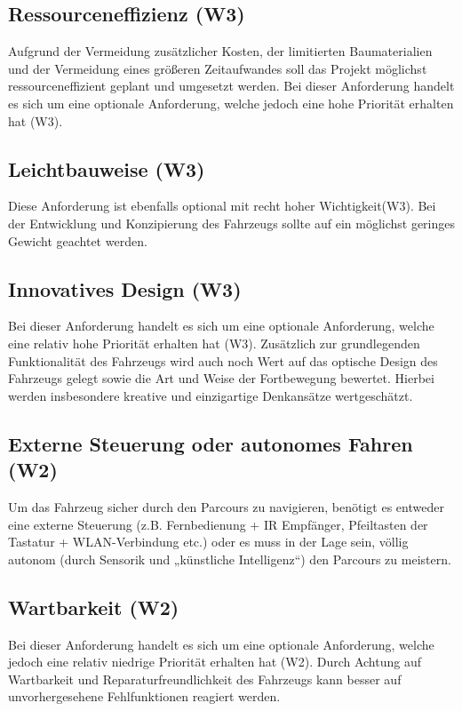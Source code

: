 \subsection*{Ressourceneffizienz (W3)}
Aufgrund der Vermeidung zusätzlicher Kosten, der limitierten Baumaterialien und der Vermeidung eines größeren Zeitaufwandes soll das Projekt möglichst ressourceneffizient geplant und umgesetzt werden. Bei dieser Anforderung handelt es sich um eine optionale Anforderung, welche jedoch eine hohe Priorität erhalten hat (W3).

\subsection*{Leichtbauweise (W3)}
Diese Anforderung ist ebenfalls optional mit recht hoher Wichtigkeit(W3). Bei der Entwicklung und Konzipierung des Fahrzeugs sollte auf ein möglichst geringes Gewicht geachtet werden.

\subsection*{Innovatives Design (W3)}
Bei dieser Anforderung handelt es sich um eine optionale Anforderung, welche eine relativ hohe Priorität erhalten hat (W3). Zusätzlich zur grundlegenden Funktionalität des Fahrzeugs wird auch noch Wert auf das optische Design des Fahrzeugs gelegt sowie die Art und Weise der Fortbewegung bewertet. Hierbei werden insbesondere kreative und einzigartige Denkansätze wertgeschätzt.

\subsection*{Externe Steuerung oder autonomes Fahren (W2)}
Um das Fahrzeug sicher durch den Parcours zu navigieren, benötigt es entweder eine externe Steuerung (z.B. Fernbedienung + IR Empfänger, Pfeiltasten der Tastatur + WLAN-Verbindung etc.) oder es muss in der Lage sein, völlig autonom (durch Sensorik und „künstliche Intelligenz“) den Parcours zu meistern.

\subsection*{Wartbarkeit (W2)}
Bei dieser Anforderung handelt es sich um eine optionale Anforderung, welche jedoch eine relativ niedrige Priorität erhalten hat (W2). Durch Achtung auf Wartbarkeit und Reparaturfreundlichkeit des Fahrzeugs kann besser auf unvorhergesehene Fehlfunktionen reagiert werden.

